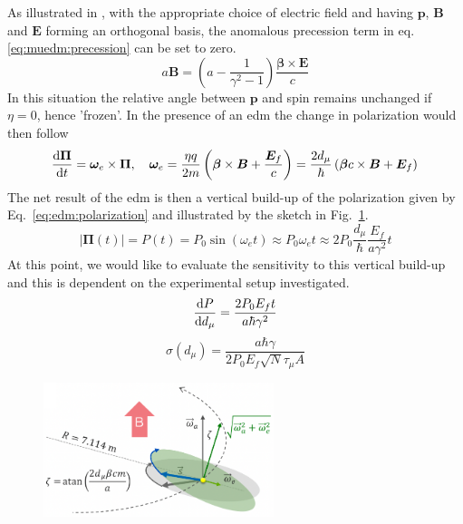 \begin{refsection}
        As illustrated in \cite{1,9}, with the appropriate choice of electric field and having $\bm{p}$, $\bm{B}$ and $\bm{E}$ forming an orthogonal basis, the anomalous precession term in eq. \ref{eq:muedm:precession} can be set to zero. 
        \begin{equation}
            a\bm{B}=\left( a-\frac{1}{\gamma^2-1} \right)\frac{\bm{\beta}\times\bm{E}}{c}
        \end{equation}
        In this situation the relative angle between $\bm{p}$ and spin remains unchanged if $\eta=0$, hence 'frozen'. 
        In the presence of an \gls{edm} the change in polarization would then follow
        \begin{equation}
            \label{eq:freezed}
            \dv{\bm{\Pi}}{t}=\bm{\omega}_e \times \bm{\Pi}, \quad
            \bm{\omega}_e=\frac{\eta q}{2m} \left(\bm{\beta}\times\bm{B}+\frac{\bm{E}_f}{c} \right) =
            \frac{2 d_\mu}{\hbar} \left(\bm{\beta}c\times\bm{B}+\bm{E}_f\right)
        \end{equation}
        The net result of the \gls{edm} is then a vertical build-up of the polarization given by Eq.~\ref{eq:edm:polarization} and illustrated by the sketch in Fig.~\ref{fig:muEDM:g-2_EDM}.
        \begin{equation}
            |\bm{\Pi}(t)|=P(t)=P_0\sin(\omega_e t)\approx P_0 \omega_e t \approx 2P_0\frac{d_\mu}{\hbar}\frac{E_f}{a\gamma^2}t
            \label{eq:edm:polarization}
        \end{equation}    
        At this point, we would like to evaluate the sensitivity to this vertical build-up and this is dependent on the experimental setup investigated.
        \begin{equation}
            \dv{P}{d_\mu}=\frac{2P_0E_ft}{a\hbar\gamma^2}
        \end{equation}     
        \begin{equation}
           \sigma(d_\mu)=\frac{a\hbar\gamma}{2P_0E_f\sqrt{N}\tau_\mu A}
        \end{equation}  
        
       

        \begin{figure}
            \centering
            \includegraphics[width = 0.6\textwidth]{Figures/muEDM/g-2_EDM.png}
            \caption{}
            \label{fig:muEDM:g-2_EDM}
        \end{figure}
        

\end{refsection}
